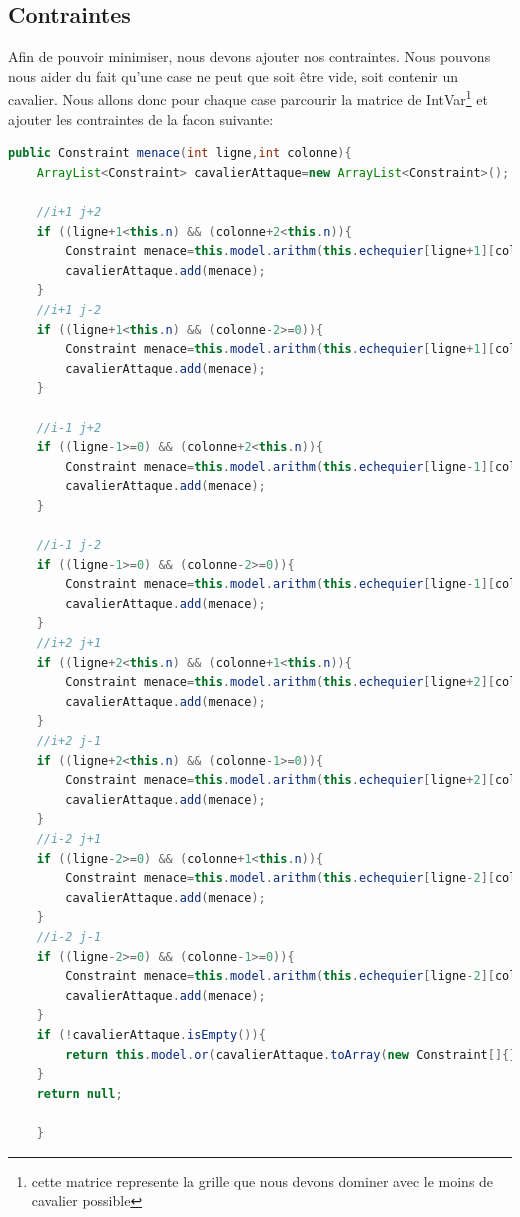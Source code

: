 \documentclass[a4paper,10pt]{article}
\begin{document}
\subsection{Contraintes}
\par Afin de pouvoir minimiser, nous devons ajouter nos contraintes. Nous pouvons nous aider du fait qu'une case ne peut que soit être vide, soit contenir un cavalier. Nous allons donc pour chaque case parcourir la matrice de IntVar\footnote{cette matrice represente la grille que nous devons dominer avec le moins de cavalier possible} et ajouter les contraintes de la facon suivante:
\begin{lstlisting}[language=Java,basicstyle=\tiny]
public Constraint menace(int ligne,int colonne){
	ArrayList<Constraint> cavalierAttaque=new ArrayList<Constraint>();
		
	//i+1 j+2
	if ((ligne+1<this.n) && (colonne+2<this.n)){
		Constraint menace=this.model.arithm(this.echequier[ligne+1][colonne+2], "!=", this.echequier[ligne][colonne]);
		cavalierAttaque.add(menace);
	}
	//i+1 j-2
	if ((ligne+1<this.n) && (colonne-2>=0)){
		Constraint menace=this.model.arithm(this.echequier[ligne+1][colonne-2], "!=", this.echequier[ligne][colonne]);
		cavalierAttaque.add(menace);
	}
	
	//i-1 j+2
	if ((ligne-1>=0) && (colonne+2<this.n)){
		Constraint menace=this.model.arithm(this.echequier[ligne-1][colonne+2], "!=", this.echequier[ligne][colonne]);
		cavalierAttaque.add(menace);
	}
	
	//i-1 j-2
	if ((ligne-1>=0) && (colonne-2>=0)){
		Constraint menace=this.model.arithm(this.echequier[ligne-1][colonne-2], "!=", this.echequier[ligne][colonne]);
		cavalierAttaque.add(menace);
	}
	//i+2 j+1	
	if ((ligne+2<this.n) && (colonne+1<this.n)){
		Constraint menace=this.model.arithm(this.echequier[ligne+2][colonne+1], "!=", this.echequier[ligne][colonne]);
		cavalierAttaque.add(menace);
	}
	//i+2 j-1
	if ((ligne+2<this.n) && (colonne-1>=0)){
		Constraint menace=this.model.arithm(this.echequier[ligne+2][colonne-1], "!=",this.echequier[ligne][colonne]);
		cavalierAttaque.add(menace);
	}
	//i-2 j+1
	if ((ligne-2>=0) && (colonne+1<this.n)){
		Constraint menace=this.model.arithm(this.echequier[ligne-2][colonne+1], "!=",this.echequier[ligne][colonne]);
		cavalierAttaque.add(menace);
	}
	//i-2 j-1
	if ((ligne-2>=0) && (colonne-1>=0)){
		Constraint menace=this.model.arithm(this.echequier[ligne-2][colonne-1], "!=", this.echequier[ligne][colonne]);
		cavalierAttaque.add(menace);
	}
	if (!cavalierAttaque.isEmpty()){
		return this.model.or(cavalierAttaque.toArray(new Constraint[]{}));
	}
	return null;
		
	}
\end{lstlisting}
\end{document}
